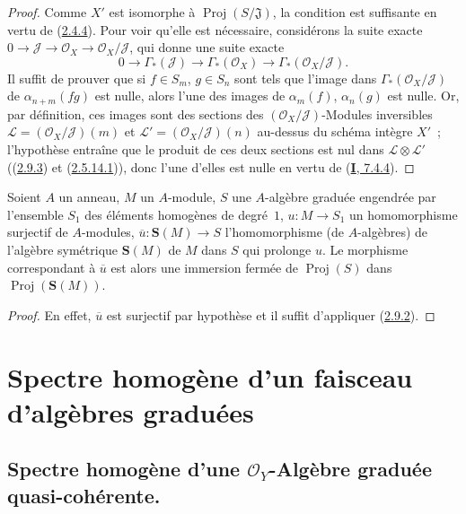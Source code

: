 
\begin{proof}
Comme $X'$ est isomorphe à $\operatorname{Proj}(S/\mathfrak{J})$, la
condition est suffisante en vertu de (\hyperref[II.2.4.4-fr]{2.4.4}). Pour
voir qu'elle est nécessaire, considérons la suite exacte
$0\to\mathcal{J}\to\mathcal{O}_X\to\mathcal{O}_X/\mathcal{J}$, qui donne une
suite exacte
\[
  0\longrightarrow\Gamma_*(\mathcal{J})
  \longrightarrow\Gamma_*(\mathcal{O}_X)
  \longrightarrow\Gamma_*(\mathcal{O}_X/\mathcal{J}).
\]
Il suffit de prouver que si $f\in S_m$, $g\in S_n$ sont tels que l'image dans
$\Gamma_*(\mathcal{O}_X/\mathcal{J})$ de $\alpha_{n+m}(fg)$ est nulle,
alors l'une des images de $\alpha_m(f)$, $\alpha_n(g)$ est nulle. Or, par
définition, ces images sont des sections des
$(\mathcal{O}_X/\mathcal{J})$-Modules inversibles
$\mathcal{L}=(\mathcal{O}_X/\mathcal{J})(m)$ et
$\mathcal{L}'=(\mathcal{O}_X/\mathcal{J})(n)$ au-dessus du schéma intègre
$X'$~; l'hypothèse entraîne que le produit de ces deux sections est nul dans
$\mathcal{L}\otimes\mathcal{L}'$
((\hyperref[II.2.9.3-fr]{2.9.3}) et
(\hyperref[II.2.5.14.1-fr]{2.5.14.1})), donc l'une d'elles est nulle en vertu
de (\hyperref[I.7.4.4-fr]{\textbf{I}, 7.4.4}).
\end{proof}

\begin{corollary}[2.9.5]
\label{II.2.9.5-fr}
Soient $A$ un anneau, $M$ un $A$-module, $S$ une $A$-algèbre graduée
engendrée par l'ensemble $S_1$ des éléments homogènes de degré~$1$,
$u:M\to S_1$ un homomorphisme surjectif de $A$-modules,
$\overline{u}:\mathbf{S}(M)\to S$ l'homomorphisme (de $A$-algèbres) de
l'algèbre symétrique $\mathbf{S}(M)$ de $M$ dans $S$ qui prolonge $u$. Le
morphisme correspondant à $\overline{u}$ est alors une immersion fermée de
$\operatorname{Proj}(S)$ dans $\operatorname{Proj}(\mathbf{S}(M))$.
\end{corollary}

\begin{proof}
En effet, $\overline{u}$ est surjectif par hypothèse et il suffit d'appliquer
(\hyperref[II.2.9.2-fr]{2.9.2}).
\end{proof}

\section{Spectre homogène d'un faisceau d'algèbres graduées}
\label{section:II.3-fr}

\subsection{Spectre homogène d'une $\mathcal{O}_Y$-Algèbre graduée
quasi-cohérente.}
\label{subsection:II.3.1-fr}
\label{II.3.1-fr}

